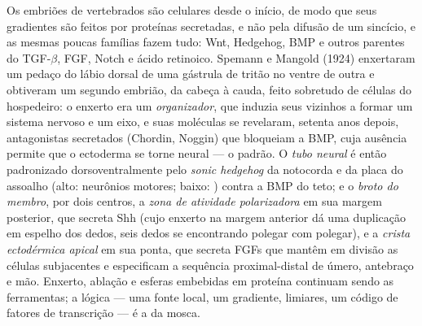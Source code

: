\begin{definition}\label{def:b3:developmental-genetics:organiser}
Os embriões de vertebrados são celulares desde o início, de modo que
seus gradientes são feitos por proteínas secretadas, e não pela difusão
de um sincício, e as mesmas poucas famílias fazem tudo: Wnt, Hedgehog,
BMP e outros parentes do TGF-$\beta$, FGF, Notch e ácido retinoico.
Spemann e Mangold (1924) enxertaram um pedaço do lábio dorsal de uma
gástrula de tritão no ventre de outra e obtiveram um segundo embrião, da
cabeça à cauda, feito sobretudo de células do hospedeiro: o enxerto era
um \emph{organizador}, que induzia seus vizinhos a formar um sistema
nervoso e um eixo, e suas moléculas se revelaram, setenta anos depois,
antagonistas secretados (Chordin, Noggin) que bloqueiam a BMP, cuja
ausência permite que o ectoderma se torne neural --- o padrão. O
\emph{tubo neural} é então padronizado dorsoventralmente pelo
\emph{sonic hedgehog} da notocorda e da placa do assoalho (alto:
neurônios motores; baixo: ) contra a BMP do teto; e o
\emph{broto do membro}, por dois centros, a \emph{zona de atividade
polarizadora} em sua margem posterior, que secreta Shh (cujo enxerto na
margem anterior dá uma duplicação em espelho dos dedos, seis dedos se
encontrando polegar com polegar), e a \emph{crista ectodérmica apical}
em sua ponta, que secreta FGFs que mantêm em divisão as células
subjacentes e especificam a sequência proximal-distal de úmero,
antebraço e mão. Enxerto, ablação e esferas embebidas em proteína
continuam sendo as ferramentas; a lógica --- uma fonte local, um
gradiente, limiares, um código de fatores de transcrição --- é a da
mosca.
\end{definition}

